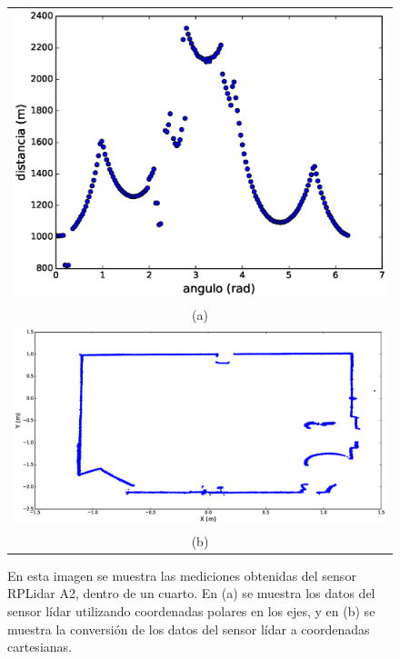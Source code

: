 \begin{figure}%
	\centering
	\begin{tabular}{c}
		\multicolumn{1}{c}{\includegraphics[width=.65\textwidth]{images/polarLidar.eps}}\\
      	\multicolumn{1}{c}{(a)}\\
      	\multicolumn{1}{c}{\includegraphics[width=1.\textwidth]{images/2dLidar.eps}}\\
      	\multicolumn{1}{c}{(b)}
	\end{tabular}
	\captionsetup{font=footnotesize}
    \caption{\label{f:lidarPlot}En esta imagen se muestra las mediciones obtenidas del sensor 
    RPLidar A2, dentro de un cuarto. En (a) se muestra los datos del sensor lídar utilizando 
    coordenadas polares en los ejes, y en (b) se muestra la conversión de los datos del 
    sensor lídar a coordenadas cartesianas.}
\end{figure}

